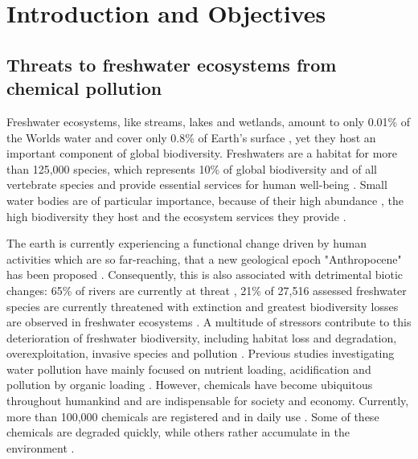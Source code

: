 

\chapter{Introduction and Objectives}
\label{sec:introduction} 

\section[Threats to freshwater ecosystems from chemical pollution]{\texorpdfstring{Threats to freshwater ecosystems from \\ chemical pollution}{Threats to freshwater ecosystems from chemical pollution}}

Freshwater ecosystems, like streams, lakes and wetlands, amount to only 0.01\% of the Worlds water and cover only 0.8\% of Earth's surface \citep{dudgeon_freshwater_2006}, yet they host an important component of global biodiversity. 
Freshwaters are a habitat for more than 125,000 species, which represents 10\% of global biodiversity and  of all vertebrate species \citep{balian_freshwater_2007,  strayer_freshwater_2010} and provide essential services for human well-being \citep{aylward_freshwater_2005}. 
Small water bodies are of particular importance, because of their high abundance \citep{downing_global_2012}, the high biodiversity they host \citep{davies_comparative_2008} and the ecosystem services they provide \citep{biggs_importance_2016}. 

The earth is currently experiencing a functional change driven by human activities which are so far-reaching, that a new geological epoch "Anthropocene" has been proposed \citep{steffen_2011, waters_anthropocene_2016}. 
Consequently, this is also associated with detrimental biotic changes: 65\% of rivers are currently at threat \citep{vorosmarty_global_2010}, 21\% of 27,516 assessed freshwater species are currently threatened with extinction \citep{iucn_iucn_2016} and greatest biodiversity losses are observed in freshwater ecosystems \citep{wwf_living_2016}. 
A multitude of stressors contribute to this deterioration of freshwater biodiversity, including habitat loss and degradation, overexploitation, invasive species and pollution \citep{dudgeon_freshwater_2006, vorosmarty_global_2010, wwf_living_2016, collen_global_2014}. 
Previous studies investigating water pollution have mainly focused on nutrient loading, acidification and pollution by organic loading \citep{schafer_contribution_2016}. 
However, chemicals have become ubiquitous throughout humankind and are indispensable for society and economy. 
Currently, more than 100,000 chemicals are registered and in daily use \citep{schwarzman_new_2009, schwarzenbach_global_2010}.
Some of these chemicals are degraded quickly, while others rather accumulate in the environment \citep{fenner_evaluating_2013}.

